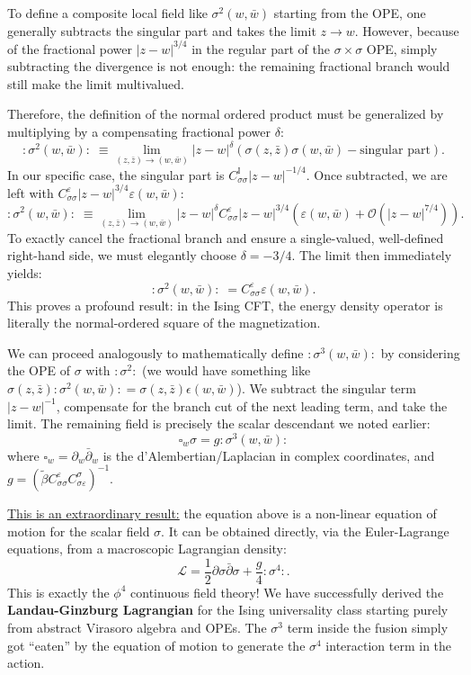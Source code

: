 To define a composite local field like \(\sigma^2(w, \bar{w})\) starting from the OPE, one generally subtracts the singular part and takes the limit \(z \to w\). However, because of the fractional power \(|z-w|^{3/4}\) in the regular part of the \(\sigma \times \sigma\) OPE, simply subtracting the divergence is not enough: the remaining fractional branch would still make the limit multivalued.

Therefore, the definition of the normal ordered product must be generalized by multiplying by a compensating fractional power \(\delta\):
\[
    :\sigma^2(w, \bar{w}): \;\equiv \lim_{(z,\bar{z}) \to (w,\bar{w})} |z-w|^\delta \left( \sigma(z,\bar{z})\sigma(w,\bar{w}) - \text{singular part} \right).
\]
In our specific case, the singular part is \(C_{\sigma\sigma}^{\mathbb{I}} |z-w|^{-1/4}\). Once subtracted, we are left with \(C_{\sigma\sigma}^\varepsilon |z-w|^{3/4} \varepsilon(w, \bar{w})\):
\[
    :\sigma^2(w, \bar{w}): \;\equiv \lim_{(z,\bar{z}) \to (w,\bar{w})} |z-w|^\delta C_{\sigma\sigma}^\varepsilon |z-w|^{3/4} \left( \varepsilon(w, \bar{w}) + \mathcal{O}(|z-w|^{7/4}) \right).
\]
To exactly cancel the fractional branch and ensure a single-valued, well-defined right-hand side, we must elegantly choose \(\delta = -3/4\). The limit then immediately yields:
\[
    :\sigma^2(w, \bar{w}): \; = C_{\sigma\sigma}^\varepsilon \varepsilon(w, \bar{w}).
\]
This proves a profound result: in the Ising CFT, the energy density operator is literally the normal-ordered square of the magnetization.

We can proceed analogously to mathematically define \(:\sigma^3(w, \bar{w}):\) by considering the OPE of \(\sigma\) with \(:\sigma^2:\) (we would have something like \(\sigma(z, \bar{z}):\sigma^2(w, \bar{w}): = \sigma(z, \bar{z})\epsilon(w, \bar{w})\)). We subtract the singular term \(|z-w|^{-1}\), compensate for the branch cut of the next leading term, and take the limit. The remaining field is precisely the scalar descendant we noted earlier:
\[
    \square_w \sigma = g :\sigma^3(w, \bar{w}):
\]
where \(\square_w = \partial_w \bar{\partial}_w\) is the d'Alembertian/Laplacian in complex coordinates, and \(g = (\tilde{\beta} C_{\sigma\sigma}^\varepsilon C_{\sigma \varepsilon}^{\sigma})^{-1}\).

\uline{This is an extraordinary result:} the equation above is a non-linear equation of motion for the scalar field \(\sigma\). It can be obtained directly, via the Euler-Lagrange equations, from a macroscopic Lagrangian density:
\[
    \mathcal{L} = \frac{1}{2}\partial\sigma \bar{\partial}\sigma + \frac{g}{4}:\sigma^4:.
\]
This is exactly the \(\phi^4\) continuous field theory! We have successfully derived the \textbf{Landau-Ginzburg Lagrangian} for the Ising universality class starting purely from abstract Virasoro algebra and OPEs. The \(\sigma^3\) term inside the fusion simply got ``eaten'' by the equation of motion to generate the \(\sigma^4\) interaction term in the action.

